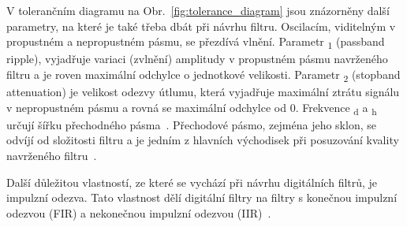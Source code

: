 V tolerančním diagramu na Obr.~\ref{fig:tolerance_diagram} jsou znázorněny další
parametry, na které je také třeba dbát při návrhu filtru. Oscilacím, viditelným
v propustném a nepropustném pásmu, se přezdívá vlnění. Parametr \textdelta
\textsubscript{1} (passband ripple), vyjadřuje variaci (zvlnění) amplitudy v
propustném pásmu navrženého filtru a je roven maximální odchylce o jednotkové
velikosti. Parametr \textdelta \textsubscript{2} (stopband attenuation) je
velikost odezvy útlumu, která vyjadřuje maximální ztrátu signálu v nepropustném
pásmu a rovná se maximální odchylce od 0. Frekvence \textomega \textsubscript{d}
a \textomega \textsubscript{h} určují šířku přechodného
pásma~\cite{Prchal2000,Lyons1997}. Přechodové pásmo, zejména jeho sklon, se
odvíjí od složitosti filtru a je jedním z hlavních východisek při posuzování
kvality navrženého filtru~\cite{Jan2002}.

Další důležitou vlastností, ze které se vychází při návrhu digitálních filtrů,
je impulzní odezva. Tato vlastnost dělí digitální filtry na filtry s konečnou
impulzní odezvou (FIR) a nekonečnou impulzní odezvou (IIR)~\cite{Skop1994}.

